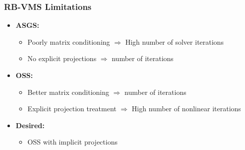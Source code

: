 \begin{frame}
\frametitle{RB-VMS Limitations}
\vfill
\begin{itemize}
	\item<1-> \textbf{ASGS:}
	\begin{itemize}
		\item<2-> Poorly matrix conditioning $ \Rightarrow $ \alert{High} number of \alert{solver} iterations
		\item<3-> No explicit projections $ \Rightarrow $  number of  iterations
	\end{itemize}
	\item<4-> \textbf{OSS:}
	\begin{itemize}
		\item<5-> Better matrix conditioning $ \Rightarrow $  number of  iterations
		\item<6-> Explicit projection treatment $ \Rightarrow $ \alert{High} number of \alert{nonlinear} iterations
	\end{itemize}
	\item<7-> \textbf{Desired:} 
		\begin{itemize}
		\item<7-> OSS with implicit projections
		\end{itemize}
\end{itemize}
\vfill
\end{frame}
